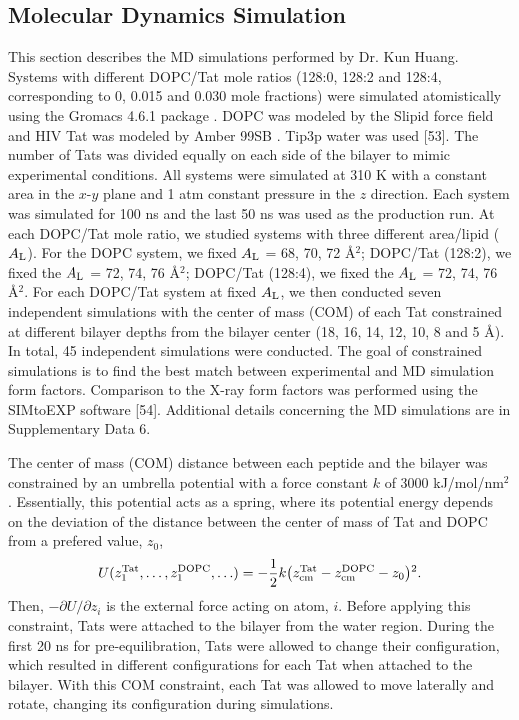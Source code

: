 \subsection{Molecular Dynamics Simulation}
This section describes the MD simulations performed by Dr. Kun Huang.
Systems with different DOPC/Tat mole ratios (128:0, 128:2 and 128:4, corresponding to
0, 0.015 and 0.030 mole fractions) were simulated atomistically using the Gromacs 4.6.1
package \cite{ref:Hess08}. 
DOPC was modeled by the Slipid force field 
\cite{ref:Jambeck12_JPCB,ref:Jambeck12_JCTC} 
and HIV Tat was modeled by Amber 99SB \cite{ref:Hornak06}. 
Tip3p water was used [53]. The number of Tats was divided equally on
each side of the bilayer to mimic experimental conditions. All systems were simulated at 310 K
with a constant area in the $x$-$y$ plane and 1 atm constant pressure in the $z$ direction. Each
system was simulated for 100 ns and the last 50 ns was used as the production run.
At each DOPC/Tat mole ratio, we studied systems with three different area/lipid ($A_\textrm{L}$).
For the DOPC system, we fixed $A_\textrm{L}$ = 68, 70, 72 \AA$^2$; 
DOPC/Tat (128:2), we fixed the $A_\textrm{L}$ = 72, 74, 76 \AA$^2$; 
DOPC/Tat (128:4), we fixed the $A_\textrm{L}$ = 72, 74, 76 \AA$^2$. 
For each DOPC/Tat system at fixed $A_\textrm{L}$, 
we then conducted seven independent simulations with the center of mass (COM) of
each Tat constrained at different bilayer depths from the bilayer center 
(18, 16, 14, 12, 10, 8 and 5 \AA). 
In total, 45 independent simulations were conducted. 
The goal of constrained simulations is to find the best match between 
experimental and MD simulation form factors. Comparison to
the X-ray form factors was performed using the SIMtoEXP software [54]. 
Additional details concerning the MD simulations are in Supplementary Data 6.

The center of mass (COM) distance between each peptide and the bilayer was 
constrained by an umbrella potential with a force constant $k$ of 3000 kJ/mol/nm$^2$. 
Essentially, this potential acts as a spring, 
where its potential energy depends on the deviation of the distance 
between the center of mass of Tat and DOPC from a prefered value, $z_0$,
\begin{equation*}
  U(z_1^{\textrm{Tat}},\ldots,z_1^{\textrm{DOPC}},\ldots) = 
  -\frac{1}{2} k 
  \mathopen{}\left( z_{\textrm{cm}}^{\textrm{Tat}} - z_{\textrm{cm}}^{\textrm{DOPC}} - z_0 \right)\mathclose{}^2.
\end{equation*}
Then, $-\partial U/\partial z_i$ is the external force acting 
on atom, $i$. Before applying this constraint, Tats were attached to 
the bilayer from the water region. During the first 20 ns for 
pre-equilibration, Tats were allowed to change their configuration,
which resulted in different configurations for each Tat when attached
to the bilayer. With this COM constraint, each Tat was allowed to move
laterally and rotate, changing its configuration during simulations.

